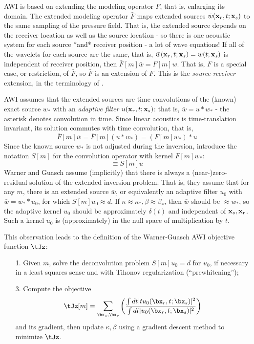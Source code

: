 AWI is based on extending the modeling operator $F$, that is, enlarging its domain.
The extended modeling operator ${\bar F}$ maps extended sources
$\bar{w}({\bf x}_r,t;{\bf x}_s)$ to the same sampling of the pressure
field. That is, the extended source depends on the receiver location
as well as the source location - so there is one acoustic system for
each source *and* receiver position - a lot of wave equations! If all
of the wavelets for each source are the same, that is, ${\bar w}({\bf
  x}_r,t;{\bf x}_s) = w(t;{\bf x}_s)$ is independent of receiver
position, then ${\bar F}[m]\bar{w} = F[m]w$. That is, $F$ is a special
case, or restriction, of ${\bar F}$, so ${\bar F}$ is an extension of
$F$. This is the {\em source-receiver} extension, in the terminology of \cite{HuangSymes2015SEG}.

AWI assumes that the extended sources are time convolutions of the
(known) exact source $w_*$ with an {\em adaptive filter} $u({\bf x}_r,t;{\bf x}_s)$: that is, $\bar{w} = u * w_*$ - the asterisk denotes convolution in time. Since linear acoustics is time-translation invariant, its solution commutes with time convolution, that is,
\[
 \bar{F}[m]\bar{w} = \bar{F}[m](u* w_*) = (F[m]w_*)*u
\]
Since the known source $w_*$ is not adjusted during the inversion, 
introduce the notation $S[m]$ for the convolution operator with kernel $F[m]w_*$:
\begin{equation}
  \label{eqn:sdef}
  \equiv S[m]u
\end{equation}
Warner and Guasch assume (implicitly) that there is always a
(near-)zero-residual solution of the extended inversion problem. That
is, they assume that for any $m$, there is an extended source
$\bar{w}$, or equivalently an adaptive filter $u_0$ with $\bar{w}=w_**u_0$, for which $S[m]u_0\approx d$. If $\kappa \approx \kappa_*, \beta \approx \beta_*$, then $\bar{w}$ should be $\approx w_*$, so the adaptive kernel $u_0$ should be approximately $\delta(t)$ and independent of ${\bf x}_s,{\bf x}_r$. Such a kernel $u_0$ is (approximately) in the null space of multiplication by $t$.

This observation leads to the definition of the Warner-Guasch AWI objective function $\tJz$:

\begin{itemize}
\item[1. ]Given $m$, solve the deconvolution problem $S[m]u_0 = d$ for
  $u_0$, if necessary in a least squares sense and with Tihonov
  regularization (``prewhitening'');
\item[3. ]Compute the objective 
  \begin{equation}
    \label{eqn:tJz}
    \tJz[m] = \sum_{\bx_s,\bx_r} \left(\frac{\int dt |tu_0(\bx_r,t;\bx_s)|^2}{\int dt |u_0(\bx_r,t;\bx_s)|^2}\right)
  \end{equation}
and its gradient, then update $\kappa,\beta$ using a gradient descent method to minimize $\tJz$.
\end{itemize}

